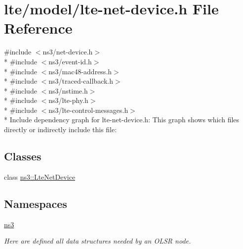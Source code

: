 \hypertarget{lte-net-device_8h}{}\section{lte/model/lte-\/net-\/device.h File Reference}
\label{lte-net-device_8h}
{\ttfamily \#include $<$ns3/net-\/device.\+h$>$}\\*
{\ttfamily \#include $<$ns3/event-\/id.\+h$>$}\\*
{\ttfamily \#include $<$ns3/mac48-\/address.\+h$>$}\\*
{\ttfamily \#include $<$ns3/traced-\/callback.\+h$>$}\\*
{\ttfamily \#include $<$ns3/nstime.\+h$>$}\\*
{\ttfamily \#include $<$ns3/lte-\/phy.\+h$>$}\\*
{\ttfamily \#include $<$ns3/lte-\/control-\/messages.\+h$>$}\\*
Include dependency graph for lte-\/net-\/device.h\+:
This graph shows which files directly or indirectly include this file\+:
\subsection*{Classes}
\begin{DoxyCompactItemize}
\item 
class \hyperlink{classns3_1_1LteNetDevice}{ns3\+::\+Lte\+Net\+Device}
\end{DoxyCompactItemize}
\subsection*{Namespaces}
\begin{DoxyCompactItemize}
\item 
 \hyperlink{namespacens3}{ns3}
\begin{DoxyCompactList}\small\item\em Here are defined all data structures needed by an O\+L\+SR node. \end{DoxyCompactList}\end{DoxyCompactItemize}
